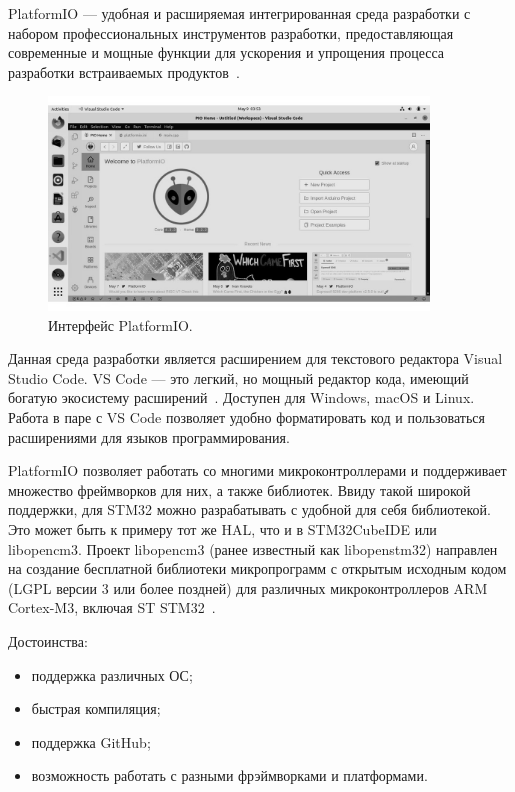 	PlatformIO --- удобная и расширяемая интегрированная среда разработки с набором профессиональных инструментов разработки, предоставляющая современные и мощные функции для ускорения и упрощения процесса разработки встраиваемых продуктов~\cite{plio}.
	
	\begin{figure}[h]
    \centering
    \includegraphics[width=0.9\textwidth]{../image/plio.jpg}
    \caption{Интерфейс PlatformIO.}
	\end{figure}
	
	Данная среда разработки является расширением для текстового редактора Visual Studio Code. VS Code --- это легкий, но мощный редактор кода, имеющий богатую экосистему расширений~\cite{docsplio}. Доступен для Windows, macOS и Linux. Работа в паре с VS Code позволяет удобно форматировать код и пользоваться расширениями для языков программирования.
	
	PlatformIO позволяет работать со многими микроконтроллерами и поддерживает множество фреймворков для них, а также библиотек. Ввиду такой широкой поддержки, для STM32 можно разрабатывать с удобной для себя библиотекой. Это может быть к примеру тот же HAL, что и в STM32CubeIDE или libopencm3. Проект libopencm3 (ранее известный как libopenstm32) направлен на создание бесплатной библиотеки микропрограмм с открытым исходным кодом (LGPL версии 3 или более поздней) для различных микроконтроллеров ARM Cortex-M3, включая ST STM32~\cite{lcm3}.


	Достоинства:
	\begin{itemize}
		\item поддержка различных ОС;
		\item быстрая компиляция;
		\item поддержка GitHub;
		\item возможность работать с разными фрэймворками и платформами.
	\end{itemize}
	

